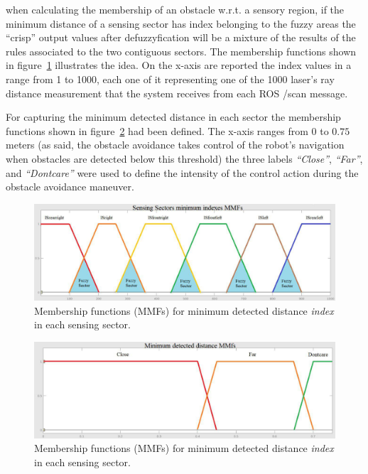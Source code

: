 when calculating the membership of an obstacle w.r.t. a sensory region, if the minimum distance of a sensing sector has index belonging to the fuzzy areas the ``crisp'' output values after defuzzyfication will be a mixture of the results of the rules associated to the two contiguous sectors. The membership functions shown in figure~\ref{indexesmmf} illustrates the idea. On the x-axis are reported the index values in a range from 1 to 1000, each one of it representing one of the 1000 laser's ray distance measurement that the system receives from each ROS /scan message.

For capturing the minimum detected distance in each sector the membership functions shown in figure~\ref{minmmf} had been defined. The x-axis ranges from 0 to $0.75$ meters (as said, the obstacle avoidance takes control of the robot's navigation when obstacles are detected below this threshold) the three labels \textit{``Close''}, \textit{``Far''}, and \textit{``Dontcare''} were used to define the intensity of the control action during the obstacle avoidance maneuver.

\begin{figure}[H]
	\centering
	\includegraphics[width=\textwidth]{images/03-foundation/indexesmmf}
	\caption{Membership functions (MMFs) for minimum detected distance \textit{index} in each sensing sector.}
	\label{indexesmmf} 
\end{figure}
\begin{figure}[H]
	\centering
	\includegraphics[width=\textwidth]{images/03-foundation/minmmf}
	\caption{Membership functions (MMFs) for minimum detected distance \textit{index} in each sensing sector.}
	\label{minmmf} 
\end{figure}

